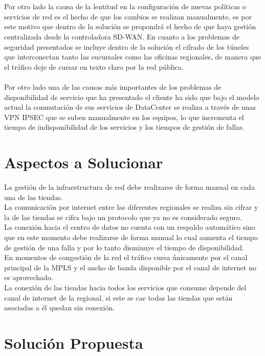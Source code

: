 \\
\\ 
Por otro lado la causa de la lentitud en la configuración de nuevas políticas o servicios de red es el hecho de que los cambios se realizan manualmente, es por este motivo que dentro de la solución se propondrá el hecho de que haya gestión centralizada desde la controladora SD-WAN. En cuanto a los problemas de seguridad presentados se incluye dentro de la solución el cifrado de los túneles que interconectan tanto las sucursales como las oficinas regionales, de manera que el tráfico deje de cursar en texto claro por la red pública.
\\
\\
Por otro lado una de las causas más importantes de los problemas de disponibilidad de servicio que ha presentado el cliente ha sido que bajo el modelo actual la conmutación de sus servicios de DataCenter se realiza a través de unas VPN IPSEC que se suben manualmente en los equipos, lo que incrementa el tiempo de indisponibilidad de los servicios y los tiempos de gestión de fallas.

\section{Aspectos a Solucionar} %
\label{sec:Aspectos a Solucionar}

La gestión de la infraestructura de red debe realizarse de forma manual en cada una de las tiendas.
\\
	La comunicación por internet entre las diferentes regionales se realiza sin cifrar y la de las tiendas se cifra bajo un protocolo que ya no es considerado seguro.
\\
	La conexión hacia el centro de datos no cuenta con un respaldo automático sino que en este momento debe realizarse de forma manual lo cual aumenta el tiempo de gestión de una falla y por lo tanto disminuye el tiempo de disponibilidad.
\\
	En momentos de congestión de la red el tráfico cursa únicamente por el canal principal de la MPLS y el ancho de banda disponible por el canal de internet no es aprovechado.
\\
La conexión de las tiendas hacia todos los servicios que consume depende del canal de internet de la regional, si este se cae todas las tiendas que están asociadas a él quedan sin conexión.

\section{Solución Propuesta} %
\label{sec:Solución Propuesta}

